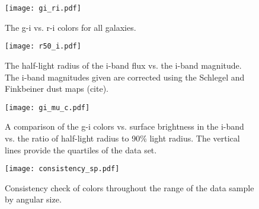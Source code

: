 \documentclass[12pt,preprint,pdftex]{aastex}
\begin{document}
\begin{figure}
\centering
\texttt{[image: gi\_ri.pdf]}
\caption{The g-i vs. r-i colors for all galaxies.}
\end{figure}


\begin{figure}
\centering
\texttt{[image: r50\_i.pdf]}
\caption{The half-light radius of the i-band flux vs. the i-band magnitude. The i-band magnitudes given are corrected using the Schlegel and Finkbeiner dust maps (cite).}
\end{figure}

\begin{figure}
\centering
\texttt{[image: gi\_mu\_c.pdf]}
\caption{A comparison of the g-i colors vs. surface brightness in the i-band vs. the ratio of half-light radius to 90\% light radius. The vertical lines provide the quartiles of the data set.}
\end{figure}

\begin{figure}
\centering
\texttt{[image: consistency\_sp.pdf]}
\caption{Consistency check of colors throughout the range of the data sample by angular size.}
\end{figure}
\end{document}
